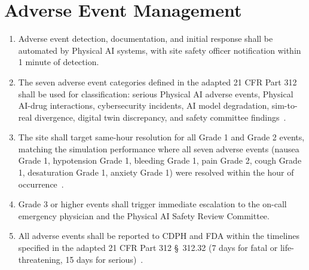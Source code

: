 \section{Adverse Event Management}

\begin{enumerate}[label=(\alph*)]
\item Adverse event detection, documentation, and initial response shall be
  automated by Physical AI systems, with site safety officer notification
  within 1 minute of detection.

\item The seven adverse event categories defined in the adapted 21 CFR Part 312
  shall be used for classification: serious Physical AI adverse events,
  Physical AI-drug interactions, cybersecurity incidents, AI model degradation,
  sim-to-real divergence, digital twin discrepancy, and safety committee
  findings~\cite{cfr312adapt}.

\item The site shall target same-hour resolution for all Grade 1 and Grade 2
  events, matching the simulation performance where all seven adverse events
  (nausea Grade 1, hypotension Grade 1, bleeding Grade 1, pain Grade 2,
  cough Grade 1, desaturation Grade 1, anxiety Grade 1) were resolved within
  the hour of occurrence~\cite{newtrial2026}.

\item Grade 3 or higher events shall trigger immediate escalation to the
  on-call emergency physician and the Physical AI Safety Review Committee.

\item All adverse events shall be reported to CDPH and FDA within the timelines
  specified in the adapted 21 CFR Part 312 \S~312.32 (7 days for fatal or
  life-threatening, 15 days for serious)~\cite{cfr312adapt}.
\end{enumerate}

